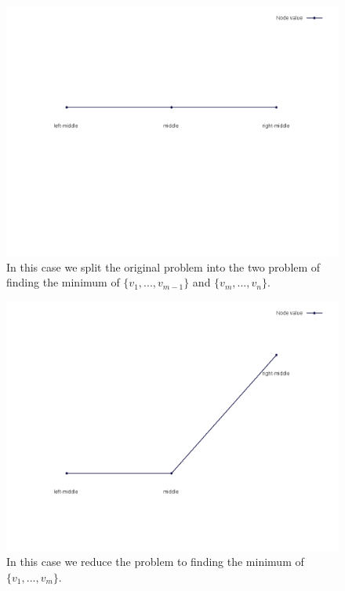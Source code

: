 \documentclass[12pt]{article}
\begin{document}
    \begin{figure}[H]
        \centering
        \includegraphics[scale=.35]{mid_case7}
        \caption{In this case we split the original problem into the two problem of finding the minimum of $\{v_1,..., v_{m - 1}\}$ and $\{v_m, ..., v_n\}$.}
    \end{figure}
    \begin{figure}[H]
        \centering
        \includegraphics[scale=.35]{mid_case8}
        \caption{In this case we reduce the problem to finding the minimum of $\{v_1, ..., v_m\}$.}
    \end{figure}
\end{document}
